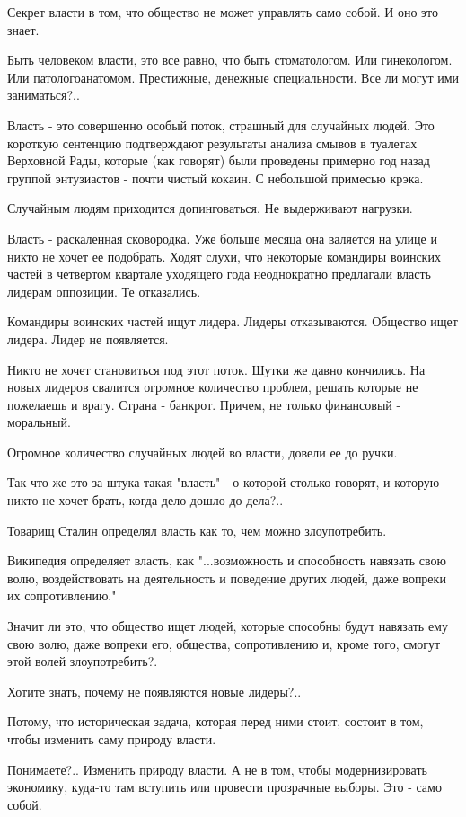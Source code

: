 Секрет власти в том, что общество не может управлять само собой. И оно это
знает. 

Быть человеком власти, это все равно, что быть стоматологом. Или гинекологом.
Или патологоанатомом. Престижные, денежные специальности. Все ли могут ими
заниматься?.. 

Власть - это совершенно особый поток, страшный для случайных людей. Это
короткую сентенцию подтверждают результаты анализа смывов в туалетах Верховной
Рады, которые (как говорят) были проведены примерно год назад группой
энтузиастов - почти чистый кокаин. С небольшой примесью крэка. 

Случайным людям приходится допинговаться. Не выдерживают нагрузки. 

Власть - раскаленная сковородка. Уже больше месяца она валяется на улице и
никто не хочет ее подобрать. Ходят слухи, что некоторые командиры воинских
частей в четвертом квартале уходящего года неоднократно предлагали власть
лидерам оппозиции. Те отказались. 

Командиры воинских частей ищут лидера. Лидеры отказываются. Общество ищет
лидера. Лидер не появляется. 

Никто не хочет становиться под этот поток. Шутки же давно кончились. На новых
лидеров свалится огромное количество проблем, решать которые не пожелаешь и
врагу. Страна - банкрот. Причем, не только финансовый - моральный. 

Огромное количество случайных людей во власти, довели ее до ручки. 

Так что же это за штука такая "власть" - о которой столько говорят, и которую
никто не хочет брать, когда дело дошло до дела?.. 

Товарищ Сталин определял власть как то, чем можно злоупотребить.

Википедия определяет власть, как "...возможность и способность навязать свою
волю, воздействовать на деятельность и поведение других людей, даже вопреки их
сопротивлению."

Значит ли это, что общество ищет людей, которые способны будут навязать ему
свою волю, даже вопреки его, общества, сопротивлению и, кроме того, смогут этой
волей злоупотребить?. 

Хотите знать, почему не появляются новые лидеры?..

Потому, что историческая задача, которая перед ними стоит, состоит в том, чтобы
изменить саму природу власти.

Понимаете?.. Изменить природу власти. А не в том, чтобы модернизировать
экономику, куда-то там вступить или провести прозрачные выборы. Это - само
собой. 

